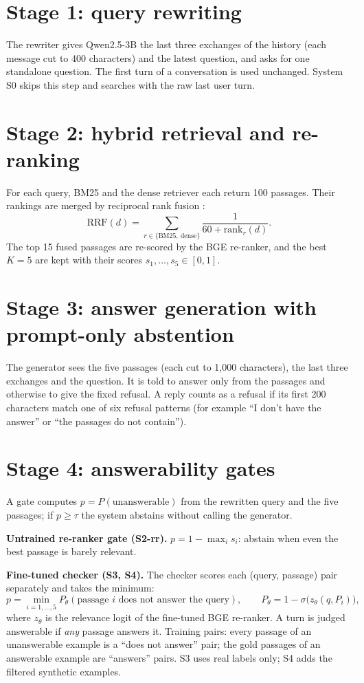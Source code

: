 \documentclass[11pt,a4paper]{report}
\newcommand{\sys}[1]{\textsf{#1}}
\begin{document}
\section{Stage 1: query rewriting}
The rewriter gives Qwen2.5-3B the last three exchanges of the history (each message cut to 400 characters) and the latest question, and asks for one standalone question. The first turn of a conversation is used unchanged. System \sys{S0} skips this step and searches with the raw last user turn.

\section{Stage 2: hybrid retrieval and re-ranking}
For each query, BM25 and the dense retriever each return 100 passages. Their rankings are merged by reciprocal rank fusion \cite{rrf}:
\[
\text{RRF}(d) = \sum_{r \in \{\text{BM25},\ \text{dense}\}} \frac{1}{60 + \text{rank}_r(d)} .
\]
The top 15 fused passages are re-scored by the BGE re-ranker, and the best $K=5$ are kept with their scores $s_1,\dots,s_5 \in [0,1]$.

\section{Stage 3: answer generation with prompt-only abstention}
The generator sees the five passages (each cut to 1{,}000 characters), the last three exchanges and the question. It is told to answer only from the passages and otherwise to give the fixed refusal. A reply counts as a refusal if its first 200 characters match one of six refusal patterns (for example ``I don't have the answer'' or ``the passages do not contain'').

\section{Stage 4: answerability gates}
A gate computes $p = P(\text{unanswerable})$ from the rewritten query and the five passages; if $p \ge \tau$ the system abstains without calling the generator.

\textbf{Untrained re-ranker gate (\sys{S2-rr}).} $p = 1 - \max_i s_i$: abstain when even the best passage is barely relevant.

\textbf{Fine-tuned checker (\sys{S3}, \sys{S4}).} The checker scores each (query, passage) pair separately and takes the minimum:
\[
p = \min_{i=1,\dots,5} P_\theta(\text{passage } i \text{ does not answer the query}), \qquad P_\theta = 1 - \sigma\big(z_\theta(q, P_i)\big),
\]
where $z_\theta$ is the relevance logit of the fine-tuned BGE re-ranker. A turn is judged answerable if \emph{any} passage answers it. Training pairs: every passage of an unanswerable example is a ``does not answer'' pair; the gold passages of an answerable example are ``answers'' pairs. \sys{S3} uses real labels only; \sys{S4} adds the filtered synthetic examples.
\end{document}
